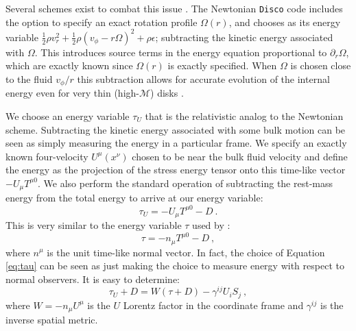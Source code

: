 \documentclass{emulateapj}
\newcommand{\eps}{\epsilon}
\newcommand{\Om}{\Omega}
\newcommand{\Mach}{\mathcal{M}}
\newcommand{\pd}{\partial}
\newcommand{\Disco}{{\texttt{Disco}}}
\begin{document}
Several schemes exist to combat this issue \citep{Masset00}. The Newtonian \Disco{} code includes the option to specify an exact rotation profile $\Om(r)$, and chooses as its energy variable $\frac{1}{2}\rho v_r^2 + \frac{1}{2}\rho(v_\phi-r\Om)^2 + \rho \eps$; subtracting the kinetic energy associated with $\Om$. This introduces source terms in the energy equation proportional to $\pd_r \Om$, which are exactly known since $\Om(r)$ is exactly specified.  When $\Om$ is chosen close to the fluid $v_\phi / r$ this subtraction allows for accurate evolution of the internal energy even for very thin (high-$\Mach$) disks \citep{Duffell16}.

We choose an energy variable $\tau_U$ that is the relativistic analog to the Newtonian scheme.  Subtracting the kinetic energy associated with some bulk motion can be seen as simply measuring the energy in a particular frame. We specify an exactly known four-velocity $U^\mu(x^\nu)$ chosen to be near the bulk fluid velocity and define the energy as the projection of the stress energy tensor onto this time-like vector $-U_\mu T^{\mu 0}$.  We also perform the standard operation of subtracting the rest-mass energy from the total energy to arrive at our energy variable:
\begin{equation}
	\tau_U = -U_\mu T^{\mu 0} - D \ . \label{eq:tauU}
\end{equation}
This is very similar to the energy variable $\tau$ used by \citep{HARM, Duez05}:
\begin{equation}
	\tau = -n_\mu T^{\mu 0} - D \ , \label{eq:tau}
\end{equation}
where $n^\mu$ is the unit time-like normal vector. In fact, the choice of Equation \eqref{eq:tau} can be seen as just making the choice to measure energy with respect to normal observers.  It is easy to determine: %
\begin{equation}
\tau_U + D = W\left(\tau + D\right) - \gamma^{ij}U_i S_j  \ ,
\end{equation}
where $W = -n_\mu U^\mu$ is the $U$ Lorentz factor in the coordinate frame and $\gamma^{ij}$ is the inverse spatial metric.
\end{document}
